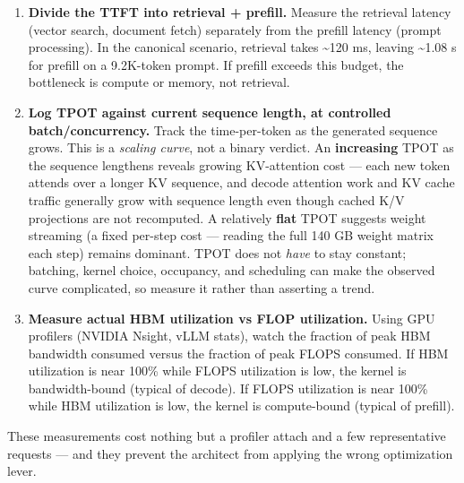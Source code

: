 \begin{enumerate}
\def\labelenumi{\arabic{enumi}.}
\item
  \textbf{Divide the TTFT into retrieval + prefill.} Measure the
  retrieval latency (vector search, document fetch) separately from the
  prefill latency (prompt processing). In the canonical scenario,
  retrieval takes \textasciitilde120 ms, leaving \textasciitilde1.08 s
  for prefill on a 9.2K-token prompt. If prefill exceeds this budget,
  the bottleneck is compute or memory, not retrieval.
\item
  \textbf{Log TPOT against current sequence length, at controlled
  batch/concurrency.} Track the time-per-token as the generated sequence
  grows. This is a \emph{scaling curve}, not a binary verdict. An
  \textbf{increasing} TPOT as the sequence lengthens reveals growing
  KV-attention cost --- each new token attends over a longer KV
  sequence, and decode attention work and KV cache traffic generally
  grow with sequence length even though cached K/V projections are not
  recomputed. A relatively \textbf{flat} TPOT suggests weight streaming
  (a fixed per-step cost --- reading the full 140 GB weight matrix each
  step) remains dominant. TPOT does not \emph{have} to stay constant;
  batching, kernel choice, occupancy, and scheduling can make the
  observed curve complicated, so measure it rather than asserting a
  trend.
\item
  \textbf{Measure actual HBM utilization vs FLOP utilization.} Using GPU
  profilers (NVIDIA Nsight, vLLM stats), watch the fraction of peak HBM
  bandwidth consumed versus the fraction of peak FLOPS consumed. If HBM
  utilization is near 100\% while FLOPS utilization is low, the kernel
  is bandwidth-bound (typical of decode). If FLOPS utilization is near
  100\% while HBM utilization is low, the kernel is compute-bound
  (typical of prefill).
\end{enumerate}

These measurements cost nothing but a profiler attach and a few
representative requests --- and they prevent the architect from applying
the wrong optimization lever.

\label{common-mistakes}


